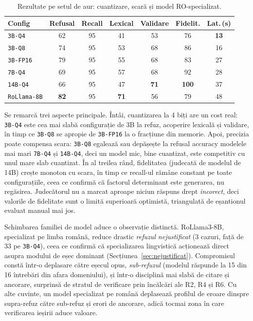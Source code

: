 \begin{table}[tb]
    \centering\footnotesize
    \begin{tabular}{l c c c c c c}
        \toprule
        \textbf{Config} & \textbf{Refusal} & \textbf{Recall} & \textbf{Lexical} & \textbf{Validare} & \textbf{Fidelit.} & \textbf{Lat.\,(s)} \\
        \midrule
        \texttt{3B-Q4}   & 62 & 95 & 41 & 53 & 76 & \textbf{13} \\
        \texttt{3B-Q8}   & 74 & 95 & 53 & 68 & 86 & 16 \\
        \texttt{3B-FP16} & 79 & 95 & 55 & 68 & 83 & 27 \\
        \texttt{7B-Q4}   & 69 & 95 & 57 & 68 & 92 & 28 \\
        \texttt{14B-Q4}  & 66 & 95 & 47 & \textbf{71} & \textbf{100} & 37 \\
        \midrule
        \texttt{RoLlama-8B} & \textbf{82} & 95 & \textbf{71} & 56 & 79 & 48 \\
        \bottomrule
    \end{tabular}
    \caption{Rezultate pe setul de aur: cuantizare, scară și model RO-specializat.}
    \label{tab:sweep}
\end{table}

Se remarcă trei aspecte principale. Întâi, cuantizarea la 4 biți are un cost real: \texttt{3B-Q4} este cea mai slabă configurație de 3B la refuz, acoperire lexicală și validare, în timp ce \texttt{3B-Q8} se apropie de \texttt{3B-FP16} la o fracțiune din memorie. Apoi, precizia poate compensa scara: \texttt{3B-Q8} egalează sau depășește la refusal accuracy modelele mai mari \texttt{7B-Q4} și \texttt{14B-Q4}, deci un model mic, bine cuantizat, este competitiv cu unul mare slab cuantizat. În al treilea rând, fidelitatea (judecată de modelul de 14B) crește monoton cu scara, în timp ce recall-ul rămâne constant pe toate configurațiile, ceea ce confirmă că factorul determinant este generarea, nu regăsirea. Judecătorul nu a marcat aproape niciun răspuns drept \emph{incorect}, deci valorile de fidelitate sunt o limită superioară optimistă, triangulată de eșantionul evaluat manual mai jos.

Schimbarea familiei de model aduce o observație distinctă. RoLlama3-8B, specializat pe limba română, reduce drastic \emph{refuzul nejustificat} (3 cazuri, față de 33 pe \texttt{3B-Q4}), ceea ce confirmă că specializarea lingvistică acționează direct asupra modului de eșec dominant (Secțiunea~\ref{sec:nejustificat}). Compromisul constă într-o deplasare către eșecul opus, \emph{sub-refuzul} (modelul răspunde la 15 din 16 întrebări din afara domeniului), și într-o disciplină mai slabă de citare și ancorare, surprinsă de stratul de verificare prin încălcări ale R2, R4 și R6. Cu alte cuvinte, un model specializat pe română deplasează profilul de eroare dinspre supra-refuz către sub-refuz și erori de ancorare, adică tocmai zona în care verificarea ieșirii aduce valoare.


